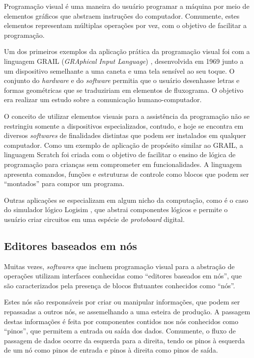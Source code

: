 \documentclass[
	12pt,				%
	openright,			%
	oneside,			%
	a4paper,			%
	main=brazil,
	english,			%
	]{ufsj-abntex2}
\begin{document}
Programação visual é uma maneira do usuário programar a máquina por meio de elementos gráficos que abstraem instruções do computador. Comumente, estes elementos representam múltiplas operações por vez, com o objetivo de facilitar a programação.

Um dos primeiros exemplos da aplicação prática da programação visual foi com a linguagem GRAIL (\textit{GRAphical Input Language}) \cite{grail}, desenvolvida em 1969 junto a um dispositivo semelhante a uma caneta e uma tela sensível ao seu toque. O conjunto do \textit{hardware} e do \textit{software} permitia que o usuário desenhasse letras e formas geométricas que se traduziriam em elementos de fluxograma. O objetivo era realizar um estudo sobre a comunicação humano-computador.

O conceito de utilizar elementos visuais para a assistência da programação não se restringiu somente a dispositivos especializados, contudo, e hoje se encontra em diversos \textit{softwares} de finalidades distintas que podem ser instalados em qualquer computador. Como um exemplo de aplicação de propósito similar ao GRAIL, a linguagem Scratch \cite{scratchlang} foi criada com o objetivo de facilitar o ensino de lógica de programação para crianças sem comprometer em funcionalidades. A linguagem apresenta comandos, funções e estruturas de controle como blocos que podem ser ``montados'' para compor um programa.

Outras aplicações se especializam em algum nicho da computação, como é o caso do simulador lógico Logisim \cite{logisim}, que abstrai componentes lógicos e permite o usuário criar circuitos em uma espécie de \textit{protoboard} digital.

\subsection{Editores baseados em nós}

Muitas vezes, \textit{softwares} que incluem programação visual para a abstração de operações utilizam interfaces conhecidas como ``editores baseados em nós'', que são caracterizados pela presença de blocos flutuantes conhecidos como ``nós''.

Estes nós são responsáveis por criar ou manipular informações, que podem ser repassadas a outros nós, se assemelhando a uma esteira de produção. A passagem destas informações é feita por componentes contidos nos nós conhecidos como ``pinos'', que permitem a entrada ou saída dos dados. Comumente, o fluxo de passagem de dados ocorre da esquerda para a direita, tendo os pinos à esquerda de um nó como pinos de entrada e pinos à direita como pinos de saída.
\end{document}
